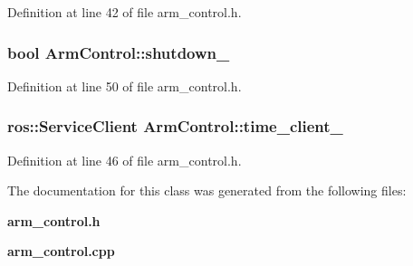 \-Definition at line 42 of file arm\-\_\-control.\-h.

\subsubsection[{shutdown\-\_\-}]{\setlength{\rightskip}{0pt plus 5cm}bool {\bf \-Arm\-Control\-::shutdown\-\_\-}\hspace{0.3cm}{\ttfamily  [private]}}\label{classArmControl_ad5509d7953165026c865c1cb64785ab3}


\-Definition at line 50 of file arm\-\_\-control.\-h.

\subsubsection[{time\-\_\-client\-\_\-}]{\setlength{\rightskip}{0pt plus 5cm}ros\-::\-Service\-Client {\bf \-Arm\-Control\-::time\-\_\-client\-\_\-}\hspace{0.3cm}{\ttfamily  [private]}}\label{classArmControl_aa2dabe49a9e661441d6a641e4aec94e9}


\-Definition at line 46 of file arm\-\_\-control.\-h.



\-The documentation for this class was generated from the following files\-:\begin{DoxyCompactItemize}
\item 
{\bf arm\-\_\-control.\-h}\item 
{\bf arm\-\_\-control.\-cpp}\end{DoxyCompactItemize}
